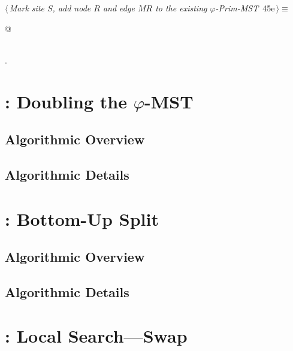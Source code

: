 \documentclass[11.5pt]{report}
\begin{document}
\vspace{-0.8cm}\newchunk
\begin{flushleft} \small
\begin{minipage}{\linewidth}\label{scrap66}\raggedright\small
{} $\langle\,${\itshape Mark site $S$, add node $R$ and edge $MR$ to the existing $\varphi$-Prim-MST}\nobreak\ {\footnotesize {45e}}$\,\rangle\equiv$
\vspace{-1ex}
\begin{list}{}{} \item
\mbox{}\verb@   @\\
\mbox{}\verb@pass@\\
\mbox{}\verb@@{\NWsep}
\end{list}
\vspace{-1.5ex}
\footnotesize
\begin{list}{}{\setlength{\itemsep}{-\parsep}\setlength{\itemindent}{-\leftmargin}}
\item {\NWtxtMacroNoRef}.

\item{}
\end{list}
\end{minipage}\vspace{4ex}
\end{flushleft}
\section{: Doubling the $\varphi$-MST}  

\subsection{Algorithmic Overview}
\subsection{Algorithmic Details}
\section{: Bottom-Up Split}  

\subsection{Algorithmic Overview}
\subsection{Algorithmic Details}\section{: Local Search---Swap}  
\end{document}
